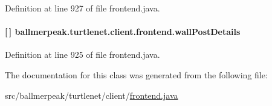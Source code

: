 Definition at line 927 of file frontend.\-java.

\hypertarget{classballmerpeak_1_1turtlenet_1_1client_1_1frontend_ad30f8befb0a4b2cf165bc34cf608866a}{
\paragraph[{wall\-Post\-Details}]{ \mbox{[}$\,$\mbox{]} ballmerpeak.\-turtlenet.\-client.\-frontend.\-wall\-Post\-Details\hspace{0.3cm}{\ttfamily [package]}}}\label{classballmerpeak_1_1turtlenet_1_1client_1_1frontend_ad30f8befb0a4b2cf165bc34cf608866a}


Definition at line 925 of file frontend.\-java.



The documentation for this class was generated from the following file\-:\begin{DoxyCompactItemize}
\item 
src/ballmerpeak/turtlenet/client/\hyperlink{frontend_8java}{frontend.\-java}\end{DoxyCompactItemize}
